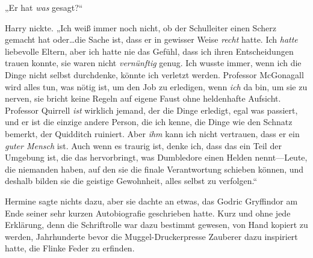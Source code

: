 „Er hat \emph{was} gesagt?“

Harry nickte. „Ich weiß immer noch nicht, ob der Schulleiter einen Scherz gemacht hat oder…die Sache ist, dass er in gewisser Weise \emph{recht} hatte. Ich \emph{hatte} liebevolle Eltern, aber ich hatte nie das Gefühl, dass ich ihren Entscheidungen trauen konnte, sie waren nicht \emph{vernünftig} genug. Ich wusste immer, wenn ich die Dinge nicht selbst durchdenke, könnte ich verletzt werden. Professor McGonagall wird alles tun, was nötig ist, um den Job zu erledigen, wenn \emph{ich} da bin, um sie zu nerven, sie bricht keine Regeln auf eigene Faust ohne heldenhafte Aufsicht. Professor Quirrell \emph{ist} wirklich jemand, der die Dinge erledigt, egal was passiert, und er ist die einzige andere Person, die ich kenne, die Dinge wie den Schnatz bemerkt, der Quidditch ruiniert. Aber \emph{ihm} kann ich nicht vertrauen, dass er ein \emph{guter Mensch} ist. Auch wenn es traurig ist, denke ich, dass das ein Teil der Umgebung ist, die das hervorbringt, was Dumbledore einen Helden nennt—Leute, die niemanden haben, auf den sie die finale Verantwortung schieben können, und deshalb bilden sie die geistige Gewohnheit, alles selbst zu verfolgen.“

Hermine sagte nichts dazu, aber sie dachte an etwas, das Godric Gryffindor am Ende seiner sehr kurzen Autobiografie geschrieben hatte. Kurz und ohne jede Erklärung, denn die Schriftrolle war dazu bestimmt gewesen, von Hand kopiert zu werden, Jahrhunderte bevor die Muggel-Druckerpresse Zauberer dazu inspiriert hatte, die Flinke Feder zu erfinden.

